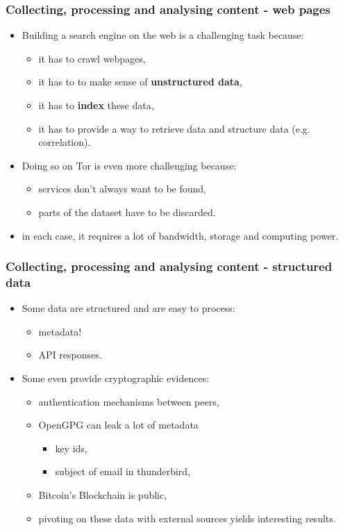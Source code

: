 \documentclass[aspectratio=169]{beamer}
\begin{document}
\begin{frame}
        \frametitle{Collecting, processing and analysing content - web pages}
        \begin{itemize}
		\item Building a search engine on the web is a challenging task because:
        	\begin{itemize}
			\item it has to crawl webpages,
			\item it has to to make sense of {\bf unstructured data},
			\item it has to {\bf index} these data,
			\item it has to provide a way to retrieve data and structure data (e.g. correlation).
        	\end{itemize}
		\item Doing so on Tor is even more challenging because:

        	\begin{itemize}
			\item services don't always want to be found,
			\item parts of the dataset have to be discarded.
        	\end{itemize}
	\item in each case, it requires a lot of bandwidth, storage and computing power.
        \end{itemize}
\end{frame}


\begin{frame}
        \frametitle{Collecting, processing and analysing content - structured data}
        \begin{itemize}
		\item Some data are structured and are easy to process:
        	\begin{itemize}
			\item metadata!
			\item API responses.
        	\end{itemize}
		\item Some even provide cryptographic evidences:
			        \begin{itemize}

         \item authentication mechanisms between peers,
         \item OpenGPG can leak a lot of metadata
        \begin{itemize}
          \item key ids,
          \item subject of email in thunderbird,
        \end{itemize}
          \item Bitcoin's Blockchain is public,
          \item pivoting on these data with external sources yields interesting results.
        \end{itemize}


        \end{itemize}
\end{frame}
\end{document}
